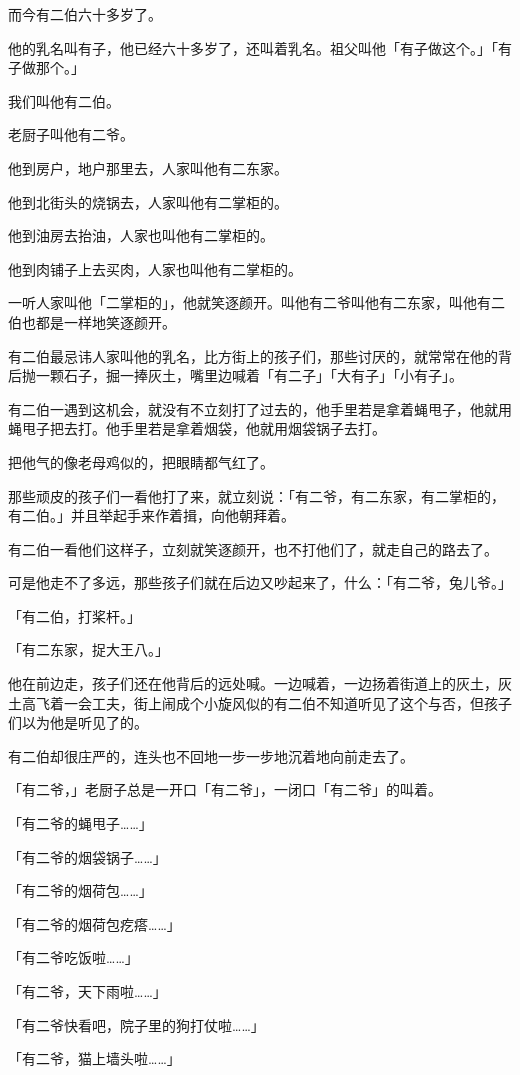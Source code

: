 \documentclass[UTF8]{ctexart}
\begin{document}
而今有二伯六十多岁了。

他的乳名叫有子，他已经六十多岁了，还叫着乳名。祖父叫他「有子做这个。」「有子做那个。」

我们叫他有二伯。

老厨子叫他有二爷。

他到房户，地户那里去，人家叫他有二东家。

他到北街头的烧锅去，人家叫他有二掌柜的。

他到油房去抬油，人家也叫他有二掌柜的。

他到肉铺子上去买肉，人家也叫他有二掌柜的。

一听人家叫他「二掌柜的」，他就笑逐颜开。叫他有二爷叫他有二东家，叫他有二伯也都是一样地笑逐颜开。

有二伯最忌讳人家叫他的乳名，比方街上的孩子们，那些讨厌的，就常常在他的背后抛一颗石子，掘一捧灰土，嘴里边喊着「有二子」「大有子」「小有子」。

有二伯一遇到这机会，就没有不立刻打了过去的，他手里若是拿着蝇甩子，他就用蝇甩子把去打。他手里若是拿着烟袋，他就用烟袋锅子去打。

把他气的像老母鸡似的，把眼睛都气红了。

那些顽皮的孩子们一看他打了来，就立刻说：「有二爷，有二东家，有二掌柜的，有二伯。」并且举起手来作着揖，向他朝拜着。

有二伯一看他们这样子，立刻就笑逐颜开，也不打他们了，就走自己的路去了。

可是他走不了多远，那些孩子们就在后边又吵起来了，什么：「有二爷，兔儿爷。」

「有二伯，打桨杆。」

「有二东家，捉大王八。」

他在前边走，孩子们还在他背后的远处喊。一边喊着，一边扬着街道上的灰土，灰土高飞着一会工夫，街上闹成个小旋风似的有二伯不知道听见了这个与否，但孩子们以为他是听见了的。

有二伯却很庄严的，连头也不回地一步一步地沉着地向前走去了。

「有二爷，」老厨子总是一开口「有二爷」，一闭口「有二爷」的叫着。

「有二爷的蝇甩子……」

「有二爷的烟袋锅子……」

「有二爷的烟荷包……」

「有二爷的烟荷包疙瘩……」

「有二爷吃饭啦……」

「有二爷，天下雨啦……」

「有二爷快看吧，院子里的狗打仗啦……」

「有二爷，猫上墙头啦……」
\end{document}
